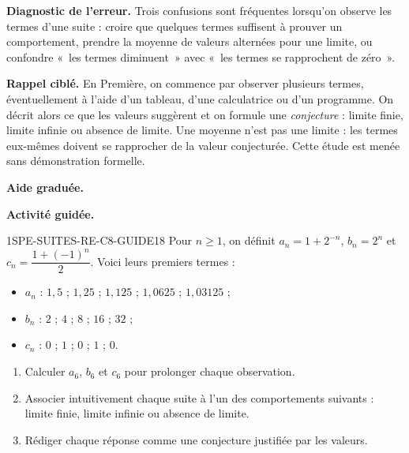 
\textbf{Diagnostic de l'erreur.}
Trois confusions sont fréquentes lorsqu'on observe les termes d'une suite :
croire que quelques termes suffisent à prouver un comportement, prendre la
moyenne de valeurs alternées pour une limite, ou confondre «~les termes
diminuent~» avec «~les termes se rapprochent de zéro~».

\textbf{Rappel ciblé.}
En Première, on commence par observer plusieurs termes, éventuellement à
l'aide d'un tableau, d'une calculatrice ou d'un programme. On décrit alors ce
que les valeurs suggèrent et on formule une \emph{conjecture} : limite finie,
limite infinie ou absence de limite. Une moyenne n'est pas une limite : les
termes eux-mêmes doivent se rapprocher de la valeur conjecturée. Cette étude
est menée sans démonstration formelle.

\textbf{Aide graduée.}

\textbf{Activité guidée.}
\begin{exercice}{1SPE-SUITES-RE-C8-GUIDE}{1}{8}
Pour $n\geqslant 1$, on définit
$a_n=1+2^{-n}$, $b_n=2^n$ et
$c_n=\dfrac{1+(-1)^n}{2}$. Voici leurs premiers termes :
\begin{itemize}
  \item $a_n$ : $1{,}5$ ; $1{,}25$ ; $1{,}125$ ; $1{,}0625$ ; $1{,}03125$ ;
  \item $b_n$ : $2$ ; $4$ ; $8$ ; $16$ ; $32$ ;
  \item $c_n$ : $0$ ; $1$ ; $0$ ; $1$ ; $0$.
\end{itemize}
\begin{enumerate}
  \item Calculer $a_6$, $b_6$ et $c_6$ pour prolonger chaque observation.
  \item Associer intuitivement chaque suite à l'un des comportements suivants :
  limite finie, limite infinie ou absence de limite.
  \item Rédiger chaque réponse comme une conjecture justifiée par les valeurs.
\end{enumerate}
\end{exercice}


